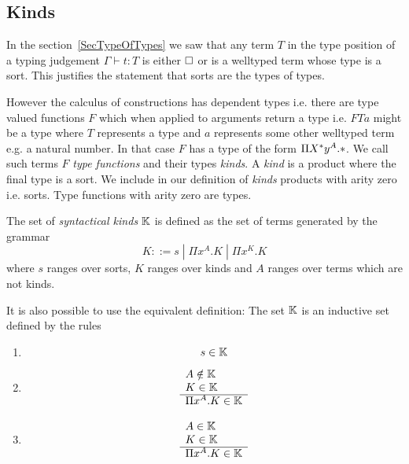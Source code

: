 \subsection{Kinds}

In the section~\ref{SecTypeOfTypes} we saw that any term $T$ in the type
position of a typing judgement $\Gamma \vdash t : T$ is either $\Box$ or is a
welltyped term whose type is a sort. This justifies the statement that sorts are
the types of types.

However the calculus of constructions has dependent types i.e. there are type
valued functions $F$ which when applied to arguments return a type i.e. $F T a $
might be a type where $T$ represents a type and $a$ represents some other
welltyped term e.g. a natural number. In that case $F$ has a type of the form
$\Pi X^* y^A.  *$. We call such terms $F$ \emph{type functions} and
their types \emph{kinds}. A \emph{kind} is a product where the final type is a
sort. We include in our definition of \emph{kinds} products with arity zero i.e.
sorts. Type functions with arity zero are types.

\begin{definition}
    The set of \emph{syntactical kinds} $\mathbb{K}$ is defined as the set of terms
    generated by the grammar
    $$
    K ::= s \;|\; \Pi x^A. K \;|\; \Pi x^K.K
    $$
    where $s$ ranges over sorts, $K$ ranges over kinds and $A$ ranges over
    terms which are not kinds.

    It is also possible to use the equivalent definition: The set $\mathbb{K}$ is an
    inductive set defined by the rules
    \begin{enumerate}
    \item
        $$ s \in \mathbb{K} $$
    \item
        $$
        \begin{array}{l} 
            A \notin \mathbb{K}
            \\
            K \in \mathbb{K}
         \\ \hline 
            \Pi x^A. K \in \mathbb{K}
        \end{array}
        $$
    \item
        $$
        \begin{array}{l} 
            A \in \mathbb{K}
            \\
            K \in \mathbb{K}
         \\ \hline 
            \Pi x^A. K \in \mathbb{K}
        \end{array}
        $$
    \end{enumerate}
\end{definition}


